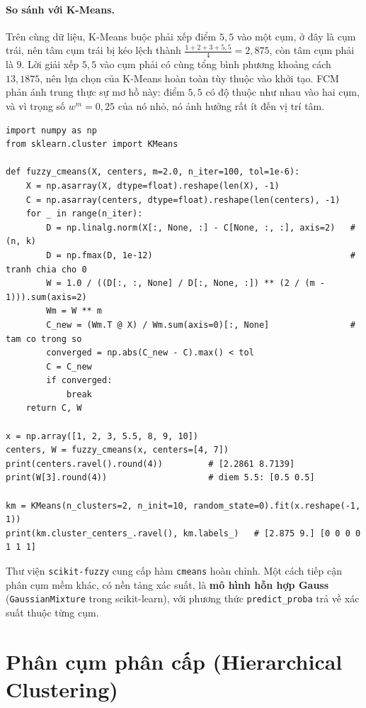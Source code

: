 \paragraph{So sánh với K-Means.} Trên cùng dữ liệu, K-Means buộc phải xếp điểm $5{,}5$ vào một cụm, ở đây là cụm trái, nên tâm cụm trái bị kéo lệch thành $\frac{1 + 2 + 3 + 5{,}5}{4} = 2{,}875$, còn tâm cụm phải là 9. Lời giải xếp $5{,}5$ vào cụm phải có cùng tổng bình phương khoảng cách $13{,}1875$, nên lựa chọn của K-Means hoàn toàn tùy thuộc vào khởi tạo. FCM phản ánh trung thực sự mơ hồ này: điểm $5{,}5$ có độ thuộc như nhau vào hai cụm, và vì trọng số $w^m = 0{,}25$ của nó nhỏ, nó ảnh hưởng rất ít đến vị trí tâm.

\begin{lstlisting}[caption={Cài đặt Fuzzy C-Means bằng NumPy và so sánh với K-Means}]
import numpy as np
from sklearn.cluster import KMeans

def fuzzy_cmeans(X, centers, m=2.0, n_iter=100, tol=1e-6):
    X = np.asarray(X, dtype=float).reshape(len(X), -1)
    C = np.asarray(centers, dtype=float).reshape(len(centers), -1)
    for _ in range(n_iter):
        D = np.linalg.norm(X[:, None, :] - C[None, :, :], axis=2)   # (n, k)
        D = np.fmax(D, 1e-12)                                       # tranh chia cho 0
        W = 1.0 / ((D[:, :, None] / D[:, None, :]) ** (2 / (m - 1))).sum(axis=2)
        Wm = W ** m
        C_new = (Wm.T @ X) / Wm.sum(axis=0)[:, None]                # tam co trong so
        converged = np.abs(C_new - C).max() < tol
        C = C_new
        if converged:
            break
    return C, W

x = np.array([1, 2, 3, 5.5, 8, 9, 10])
centers, W = fuzzy_cmeans(x, centers=[4, 7])
print(centers.ravel().round(4))         # [2.2861 8.7139]
print(W[3].round(4))                    # diem 5.5: [0.5 0.5]

km = KMeans(n_clusters=2, n_init=10, random_state=0).fit(x.reshape(-1, 1))
print(km.cluster_centers_.ravel(), km.labels_)   # [2.875 9.] [0 0 0 0 1 1 1]
\end{lstlisting}

Thư viện \texttt{scikit-fuzzy} cung cấp hàm \texttt{cmeans} hoàn chỉnh. Một cách tiếp cận phân cụm mềm khác, có nền tảng xác suất, là \textbf{mô hình hỗn hợp Gauss} (\texttt{GaussianMixture} trong scikit-learn), với phương thức \texttt{predict\_proba} trả về xác suất thuộc từng cụm.

\section{Phân cụm phân cấp (Hierarchical Clustering)}

